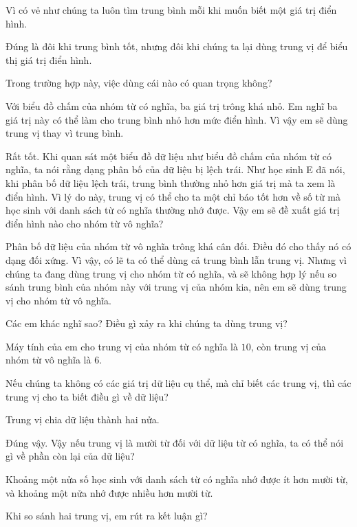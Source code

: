 \documentclass[
  10pt,
  a4paper,
  landscape,
  twoside,
  openany
]{scrbook}
\newlength{\scriptlabelwidth}
\newcommand{\scriptlabel}[1]{%
  \normalfont\slshape\makebox[\scriptlabelwidth][l]{#1}%
}
\newenvironment{scriptlist}{%
  \begin{list}{}{%
    \setlength{\labelwidth}{\scriptlabelwidth}%
    \setlength{\labelsep}{0.6em}%
    \setlength{\leftmargin}{\dimexpr\labelwidth+\labelsep\relax}%
    \setlength{\itemindent}{0pt}%
    \setlength{\listparindent}{0pt}%
    \setlength{\parsep}{0pt}%
    \setlength{\itemsep}{0.35\baselineskip}%
    \setlength{\topsep}{0.35\baselineskip}%
    \let\makelabel\scriptlabel
  }%
}{%
  \end{list}%
}
\begin{document}
{\begin{scriptlist}
  \item [Học sinh D:] Vì có vẻ như chúng ta luôn tìm trung bình mỗi khi muốn biết một giá trị điển hình.
  \item [Học sinh E:] Đúng là đôi khi trung bình tốt, nhưng đôi khi chúng ta lại dùng trung vị để biểu thị giá trị điển hình.
  \item [Giáo viên:] Trong trường hợp này, việc dùng cái nào có quan trọng không?
  \item [Học sinh E:] Với biểu đồ chấm của nhóm từ có nghĩa, ba giá trị trông khá nhỏ. Em nghĩ ba giá trị này có thể làm cho trung bình nhỏ hơn mức điển hình. Vì vậy em sẽ dùng trung vị thay vì trung bình.
  \item [Giáo viên:] Rất tốt. Khi quan sát một biểu đồ dữ liệu như biểu đồ chấm của nhóm từ có nghĩa, ta nói rằng dạng phân bố của dữ liệu bị lệch trái. Như học sinh E đã nói, khi phân bố dữ liệu lệch trái, trung bình thường nhỏ hơn giá trị mà ta xem là điển hình. Vì lý do này, trung vị có thể cho ta một chỉ báo tốt hơn về số từ mà học sinh với danh sách từ có nghĩa thường nhớ được. Vậy em sẽ đề xuất giá trị điển hình nào cho nhóm từ vô nghĩa?
  \item [Học sinh E:] Phân bố dữ liệu của nhóm từ vô nghĩa trông khá cân đối. Điều đó cho thấy nó có dạng đối xứng. Vì vậy, có lẽ ta có thể dùng cả trung bình lẫn trung vị. Nhưng vì chúng ta đang dùng trung vị cho nhóm từ có nghĩa, và sẽ không hợp lý nếu so sánh trung bình của nhóm này với trung vị của nhóm kia, nên em sẽ dùng trung vị cho nhóm từ vô nghĩa.
  \item [Giáo viên:] Các em khác nghĩ sao? Điều gì xảy ra khi chúng ta dùng trung vị?
  \item [Học sinh D:] Máy tính của em cho trung vị của nhóm từ có nghĩa là $10$, còn trung vị của nhóm từ vô nghĩa là $6$.
  \item [Giáo viên:] Nếu chúng ta không có các giá trị dữ liệu cụ thể, mà chỉ biết các trung vị, thì các trung vị cho ta biết điều gì về dữ liệu?
  \item [Học sinh D:] Trung vị chia dữ liệu thành hai nửa.
  \item [Giáo viên:] Đúng vậy. Vậy nếu trung vị là mười từ đối với dữ liệu từ có nghĩa, ta có thể nói gì về phần còn lại của dữ liệu?
  \item [Học sinh F:] Khoảng một nửa số học sinh với danh sách từ có nghĩa nhớ được ít hơn mười từ, và khoảng một nửa nhớ được nhiều hơn mười từ.
  \item [Giáo viên:] Khi so sánh hai trung vị, em rút ra kết luận gì?

\end{scriptlist}}
\end{document}
